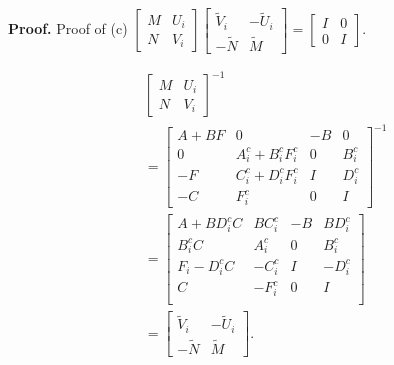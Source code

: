 \documentclass[journal]{IEEEtran}
\begin{document}
\textbf{Proof.} Proof of (c) $\left[\begin{array}{cc}
      M & U_{i} \\
      N & V_{i}
    \end{array}\right]\left[\begin{array}{cc}
      \tilde{V}_{i} & -\tilde{U}_{i} \\
      -\tilde{N}    & \tilde{M}
    \end{array}\right]=\left[\begin{array}{cc}
      I & 0 \\
      0 & I
    \end{array}\right].$

\begin{equation}
  \begin{aligned}
     & \left[\begin{array}{cc}
        M & U_{i} \\
        N & V_{i}
      \end{array}\right]^{-1}  \\
     & =\left[\begin{array}{cc|cc}
        A+B F     & 0                             & -B & 0         \\
        0         & A_{i}^{c}+B_{i}^{c} F_{i}^{c} & 0  & B_{i}^{c} \\
        \hline -F & C_{i}^{c}+D_{i}^{c} F_{i}^{c} & I  & D_{i}^{c} \\
        -C        & F_{i}^{c}                     & 0  & I
      \end{array}\right]^{-1} \\
     & =\left[\begin{array}{cc|cc}
        A+B  D_{i}^{c} C          & B  C_{i}^{c} & -B & B  D_{i}^{c} \\
        B_{i}^{c} C               & A_{i}^{c}    & 0  & B_{i}^{c}    \\
        \hline F_{i}- D_{i}^{c} C & -C_{i}^{c}   & I  & -D_{i}^{c}   \\
        C                         & -F_{i}^{c}   & 0  & I            \\
      \end{array}\right]      \\
     & =\left[\begin{array}{cc}
        \tilde{V}_{i} & -\tilde{U}_{i} \\
        -\tilde{N}    & \tilde{M}
      \end{array}\right].
  \end{aligned}
\end{equation}
\end{document}
